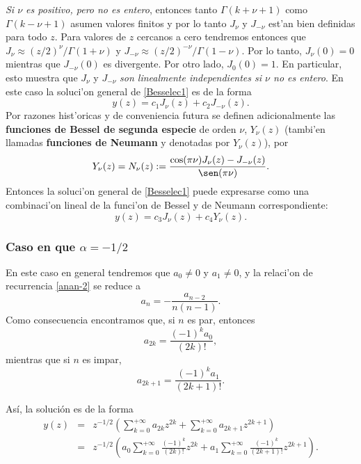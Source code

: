 \textit{Si $\nu$ es positivo, pero no es entero}, entonces tanto $\Gamma(k+\nu+1)$ como $\Gamma(k-\nu+1)$ asumen valores finitos y por lo tanto $J_\nu$ y $J_{-\nu}$ est'an bien definidas para todo $z$. Para valores de $z$ cercanos a cero tendremos entonces que $J_\nu\approx (z/2)^\nu/\Gamma(1+\nu)$ y $J_{-\nu}\approx (z/2)^{-\nu}/\Gamma(1-\nu)$. Por lo tanto, $J_\nu(0)=0$ mientras que  $J_{-\nu}(0)$ es divergente. Por otro lado, $J_0(0)=1$. En particular, esto muestra que $J_\nu$ y $J_{-\nu}$ \textit{son linealmente independientes si $\nu$ no es entero}.
En este caso la soluci'on general de \eqref{Besselec1} es de la forma
\begin{equation}
y(z)=c_1J_\nu(z)+c_2J_{-\nu}(z).
\end{equation}
Por razones hist'oricas y de conveniencia futura se definen adicionalmente las \textbf{funciones de Bessel de segunda especie} de orden $\nu$, $Y_\nu(z)$ (tambi'en llamadas \textbf{funciones de Neumann} y denotadas por $Y_\nu(z)$), por
\begin{equation}
Y_\nu(z)=N_\nu(z):=\frac{\cos(\pi\nu)J_\nu(z)-J_{-\nu}(z)}{\sen(\pi\nu)}.
\end{equation}
Entonces la soluci'on general de \eqref{Besselec1} puede expresarse como una combinaci'on lineal de la funci'on de Bessel y de Neumann correspondiente:
\begin{equation}
y(z)=c_3J_\nu(z)+c_4Y_\nu(z).
\end{equation}


\subsubsection{Caso en que $\alpha=-1/2$}

En este caso en general tendremos que $a_0\neq 0$ y $a_1\neq 0$, y la relaci'on de recurrencia \eqref{anan-2} se reduce a 
\begin{equation}
a_n=-\frac{a_{n-2}}{n(n-1)}.
\end{equation} 
Como consecuencia encontramos que, si $n$ es par, entonces
\begin{equation}
a_{2k}=\frac{(-1)^k a_0}{(2k)!},
\end{equation}
mientras que si $n$ es impar,
\begin{equation}
a_{2k+1}=\frac{(-1)^k a_1}{(2k+1)!}.
\end{equation}

As\'i, la soluci\'on es de la forma
\begin{eqnarray}
y(z)&=&z^{-1/2}\left(\sum_{k=0}^{+\infty}a_{2k}z^{2k}+\sum_{k=0}^{+\infty}a_{2k+1}z^{2k+1} \right)\\
&=&z^{-1/2}\left(a_0\sum_{k=0}^{+\infty}\frac{(-1)^k}{(2k)!}z^{2k}+a_1\sum_{k=0}^{+\infty}\frac{(-1)^k}{(2k+1)!}z^{2k+1} \right).
\end{eqnarray}

